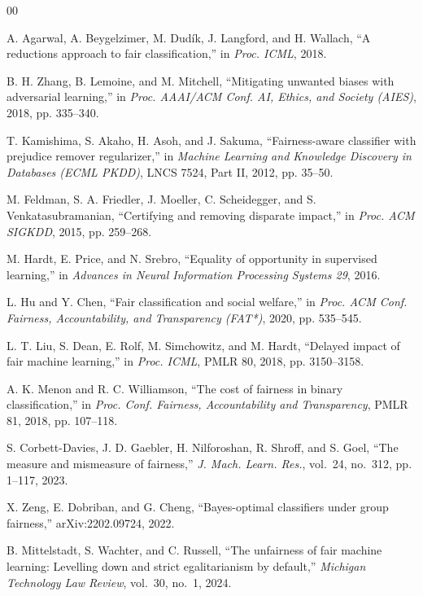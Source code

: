 \documentclass[9pt,conference]{IEEEtran}
\begin{document}
\begin{thebibliography}{00}

 A. Agarwal, A. Beygelzimer, M. Dud\'{i}k, J. Langford, and H. Wallach,
``A reductions approach to fair classification,'' in \emph{Proc. ICML}, 2018.

 B. H. Zhang, B. Lemoine, and M. Mitchell, ``Mitigating unwanted biases
with adversarial learning,'' in \emph{Proc. AAAI/ACM Conf. AI, Ethics, and Society (AIES)},
2018, pp. 335--340.

 T. Kamishima, S. Akaho, H. Asoh, and J. Sakuma, ``Fairness-aware
classifier with prejudice remover regularizer,'' in \emph{Machine Learning and Knowledge
Discovery in Databases (ECML PKDD)}, LNCS 7524, Part II, 2012, pp. 35--50.

 M. Feldman, S. A. Friedler, J. Moeller, C. Scheidegger, and
S. Venkatasubramanian, ``Certifying and removing disparate impact,'' in \emph{Proc. ACM
SIGKDD}, 2015, pp. 259--268.

 M. Hardt, E. Price, and N. Srebro, ``Equality of opportunity in
supervised learning,'' in \emph{Advances in Neural Information Processing Systems 29}, 2016.

 L. Hu and Y. Chen, ``Fair classification and social welfare,'' in
\emph{Proc. ACM Conf. Fairness, Accountability, and Transparency (FAT*)}, 2020,
pp. 535--545.

 L. T. Liu, S. Dean, E. Rolf, M. Simchowitz, and M. Hardt, ``Delayed impact
of fair machine learning,'' in \emph{Proc. ICML}, PMLR 80, 2018, pp. 3150--3158.

 A. K. Menon and R. C. Williamson, ``The cost of fairness in binary
classification,'' in \emph{Proc. Conf. Fairness, Accountability and Transparency}, PMLR 81,
2018, pp. 107--118.

 S. Corbett-Davies, J. D. Gaebler, H. Nilforoshan, R. Shroff, and
S. Goel, ``The measure and mismeasure of fairness,'' \emph{J. Mach. Learn. Res.}, vol.~24,
no.~312, pp. 1--117, 2023.

 X. Zeng, E. Dobriban, and G. Cheng, ``Bayes-optimal classifiers under
group fairness,'' arXiv:2202.09724, 2022.

 B. Mittelstadt, S. Wachter, and C. Russell, ``The unfairness of fair
machine learning: Levelling down and strict egalitarianism by default,'' \emph{Michigan
Technology Law Review}, vol.~30, no.~1, 2024.


\end{thebibliography}
\end{document}
